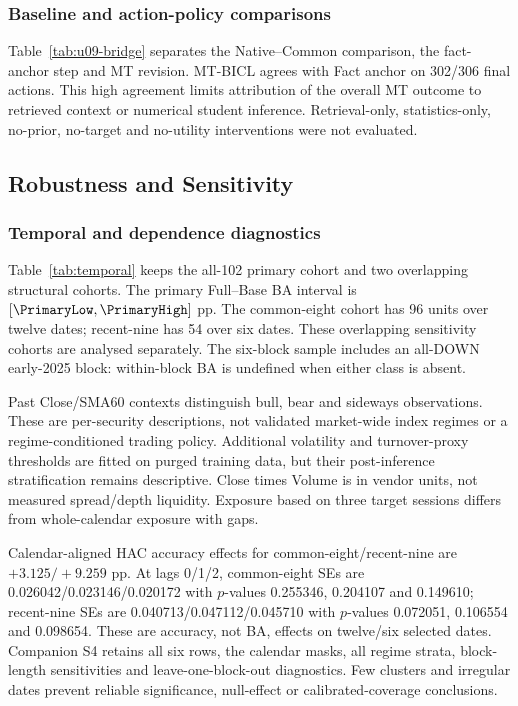 \subsubsection{Baseline and action-policy comparisons}
Table~\ref{tab:u09-bridge} separates the Native--Common comparison, the fact-anchor step and MT revision. MT-BICL agrees with Fact anchor on 302/306 final actions. This high agreement limits attribution of the overall MT outcome to retrieved context or numerical student inference. Retrieval-only, statistics-only, no-prior, no-target and no-utility interventions were not evaluated.

\subsection{Robustness and Sensitivity}
\subsubsection{Temporal and dependence diagnostics}
Table~\ref{tab:temporal} keeps the all-102 primary cohort and two overlapping structural cohorts. The primary Full--Base BA interval is $[\PrimaryLow,\PrimaryHigh]$ pp. The common-eight cohort has 96 units over twelve dates; recent-nine has 54 over six dates. These overlapping sensitivity cohorts are analysed separately. The six-block sample includes an all-DOWN early-2025 block: within-block BA is undefined when either class is absent.

Past Close/SMA60 contexts distinguish bull, bear and sideways observations. These are per-security descriptions, not validated market-wide index regimes or a regime-conditioned trading policy. Additional volatility and turnover-proxy thresholds are fitted on purged training data, but their post-inference stratification remains descriptive. Close times Volume is in vendor units, not measured spread/depth liquidity. Exposure based on three target sessions differs from whole-calendar exposure with gaps.

Calendar-aligned HAC accuracy effects for common-eight/recent-nine are $+3.125/+9.259$ pp. At lags 0/1/2, common-eight SEs are 0.026042/0.023146/0.020172 with $p$-values 0.255346, 0.204107 and 0.149610; recent-nine SEs are 0.040713/0.047112/0.045710 with $p$-values 0.072051, 0.106554 and 0.098654. These are accuracy, not BA, effects on twelve/six selected dates. Companion S4 retains all six rows, the calendar masks, all regime strata, block-length sensitivities and leave-one-block-out diagnostics. Few clusters and irregular dates prevent reliable significance, null-effect or calibrated-coverage conclusions.


